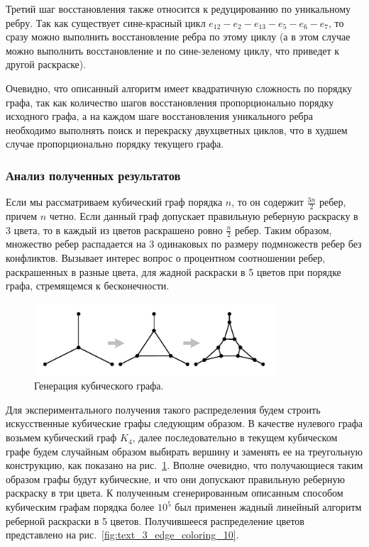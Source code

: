 Третий шаг восстановления также относится к редуцированию по уникальному ребру.
Так как существует сине-красный цикл $e_{12}-e_2-e_{13}-e_5-e_6-e_7$, то сразу можно выполнить восстановление ребра по этому циклу (а в этом случае можно выполнить восстановление и по сине-зеленому циклу, что приведет к другой раскраске).

Очевидно, что описанный алгоритм имеет квадратичную сложность по порядку графа, так как количество шагов восстановления пропорционально порядку исходного графа, а на каждом шаге восстановления уникального ребра необходимо выполнять поиск и перекраску двухцветных циклов, что в худшем случае пропорционально порядку текущего графа.

\subsubsection{Анализ полученных результатов}

Если мы рассматриваем кубический граф порядка $n$, то он содержит $\frac{3n}{2}$ ребер, причем $n$ четно.
Если данный граф допускает правильную реберную раскраску в 3 цвета, то в каждый из цветов раскрашено ровно $\frac{n}{2}$ ребер.
Таким образом, множество ребер распадается на 3 одинаковых по размеру подмножеств ребер без конфликтов.
Вызывает интерес вопрос о процентном соотношении ребер, раскрашенных в разные цвета, для жадной раскраски в 5 цветов при порядке графа, стремящемся к бесконечности.

\begin{figure}[ht]
\centering
\includegraphics[width=0.8\textwidth]{./pics/text_3_edge_coloring/9-bubble.pdf}
\singlespacing
{}\caption{Генерация кубического графа.}
\label{fig:text_3_edge_coloring_9}
\end{figure}

Для экспериментального получения такого распределения будем строить искусственные кубические графы следующим образом.
В качестве нулевого графа возьмем кубический граф $K_4$, далее последовательно в текущем кубическом графе будем случайным образом выбирать вершину и заменять ее на треугольную конструкцию, как показано на рис.~\ref{fig:text_3_edge_coloring_9}.
Вполне очевидно, что получающиеся таким образом графы будут кубические, и что они допускают правильную реберную раскраску в три цвета.
К полученным сгенерированным описанным способом кубическим графам порядка более $10^5$ был применен жадный линейный алгоритм реберной раскраски в 5 цветов.
Получившееся распределение цветов представлено на рис.~\ref{fig:text_3_edge_coloring_10}.

